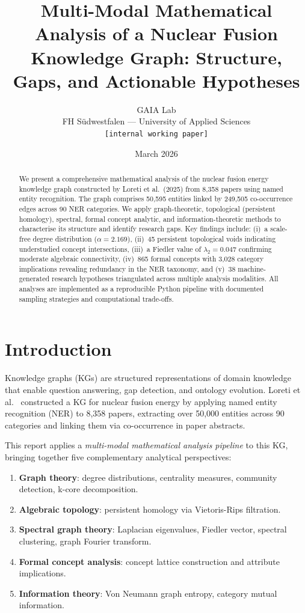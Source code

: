 \documentclass[11pt,a4paper]{article}
\title{%
  Multi-Modal Mathematical Analysis of a Nuclear Fusion\\
  Knowledge Graph: Structure, Gaps, and Actionable Hypotheses%
}
\author{
  GAIA Lab\\
  FH Südwestfalen — University of Applied Sciences\\
  \texttt{[internal working paper]}
}
\date{March 2026}
\begin{document}
\maketitle

\begin{abstract}
We present a comprehensive mathematical analysis of the nuclear fusion energy knowledge graph constructed by Loreti et al.\ (2025) from 8,358 papers using named entity recognition.  The graph comprises 50,595 entities linked by 249,505 co-occurrence edges across 90 NER categories.  We apply graph-theoretic, topological (persistent homology), spectral, formal concept analytic, and information-theoretic methods to characterise its structure and identify research gaps.  Key findings include: (i)~a scale-free degree distribution ($\alpha = 2.169$), (ii)~45 persistent topological voids indicating understudied concept intersections, (iii)~a Fiedler value of $\lambda_2 = 0.047$ confirming moderate algebraic connectivity, (iv)~865 formal concepts with 3,028 category implications revealing redundancy in the NER taxonomy, and (v)~38 machine-generated research hypotheses triangulated across multiple analysis modalities.  All analyses are implemented as a reproducible Python pipeline with documented sampling strategies and computational trade-offs.
\end{abstract}

\tableofcontents
\newpage

\section{Introduction}

Knowledge graphs (KGs) are structured representations of domain knowledge that enable question answering, gap detection, and ontology evolution.  Loreti et al.\ \citep{loreti2025} constructed a KG for nuclear fusion energy by applying named entity recognition (NER) to 8,358 papers, extracting over 50,000 entities across 90 categories and linking them via co-occurrence in paper abstracts.

This report applies a \emph{multi-modal mathematical analysis pipeline} to this KG, bringing together five complementary analytical perspectives:

\begin{enumerate}
  \item \textbf{Graph theory}: degree distributions, centrality measures, community detection, k-core decomposition.
  \item \textbf{Algebraic topology}: persistent homology via Vietoris-Rips filtration.
  \item \textbf{Spectral graph theory}: Laplacian eigenvalues, Fiedler vector, spectral clustering, graph Fourier transform.
  \item \textbf{Formal concept analysis}: concept lattice construction and attribute implications.
  \item \textbf{Information theory}: Von Neumann graph entropy, category mutual information.
\end{enumerate}
\end{document}
